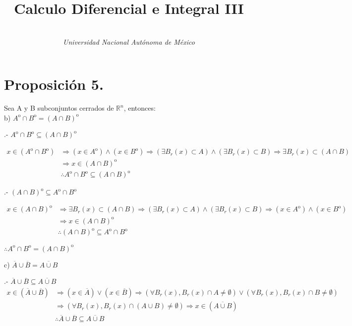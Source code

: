 \documentclass[secnumarabic,balancelastpage,amsmath,amssymb]{article}
\begin{document}
\title{\vspace{-15mm}\textbf{Calculo Diferencial e Integral III}}
\author{\\ \emph{Universidad Nacional Autónoma de México }}

\section{Proposición 5.}
Sea A y B subconjuntos cerrados de $\mathbb {R}^{n}$, entonces: \\

\noindent b) $A^{\mathrm{o}} \cap B^{\mathrm{o}} =  (A \cap B)^{\mathrm{o}}$ 

.- $A^{\mathrm{o}} \cap B^{\mathrm{o}} \subseteq (A \cap B)^{\mathrm{o}} $


\begin{equation}
\begin{aligned}
x \in (A^{\mathrm{o}} \cap B^{\mathrm{o}}) &\Rightarrow   (x \in A^{\mathrm{o}}) \land  (x \in B^{\mathrm{o}}) \Rightarrow (\exists B_r(x) \subset A) \land (\exists B_r(x) \subset B) \Rightarrow \exists B_r(x) \subset (A\cap B) \\
& \Rightarrow x \in (A \cap B)^{\mathrm{o}} \\
& \therefore A^{\mathrm{o}} \cap B^{\mathrm{o}} \subseteq (A \cap B)^{\mathrm{o}}
\end{aligned}
\end{equation}


.- $ (A \cap B)^{\mathrm{o}} \subseteq A^{\mathrm{o}} \cap B^{\mathrm{o}} $

\begin{equation}
\begin{aligned}
x \in (A \cap B)^{\mathrm{o}} & \Rightarrow \exists B_r(x) \subset (A \cap B) \Rightarrow (\exists B_r(x) \subset A) \land (\exists B_r(x) \subset B) \Rightarrow (x \in A^{\mathrm{o}})\land(x \in B^{\mathrm{o}}) \\
& \Rightarrow x\in (A \cap B)^{\mathrm{o}} \\
& \therefore  (A \cap B)^{\mathrm{o}} \subseteq A^{\mathrm{o}} \cap B^{\mathrm{o}}
\end{aligned}
\end{equation}

$\therefore  A^{\mathrm{o}} \cap B^{\mathrm{o}} =  (A \cap B)^{\mathrm{o}}$ 

\noindent c) $\overline{A} \cup \overline{B} = \overline{A \cup B}$ 

.- $\overline{A} \cup \overline{B} \subseteq \overline{A \cup B}$
\begin{equation}
\begin{aligned}
x \in  (\overline{A} \cup \overline{B} ) &\Rightarrow (x \in \overline{A}) \lor (x \in \overline{B}) \Rightarrow (\forall B_r(x), B_r(x) \cap A \neq \emptyset) \lor (\forall B_r(x), B_r(x) \cap B \neq \emptyset) \\
& \Rightarrow (\forall B_r(x), B_r(x) \cap (A \cup B) \neq \emptyset) \Rightarrow x \in (\overline{A \cup B}) \\
& \therefore \overline{A} \cup \overline{B} \subseteq \overline{A \cup B}
\end{aligned}
\end{equation}
\end{document}
